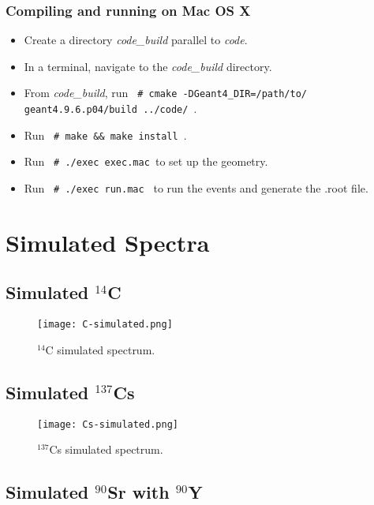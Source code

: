 \documentclass[a4paper,10pt]{article}
\begin{document}
\subsubsection{Compiling and running on Mac OS X}

\begin{itemize}
	\item Create a directory \textit{code\_build} parallel to \textit{code}.
	\item In a terminal, navigate to the \textit{code\_build} directory. 
	\item From \textit{code\_build}, run \texttt{ \# cmake -DGeant4\_DIR=/path/to/\\geant4.9.6.p04/build ../code/ }.
	\item Run \texttt{ \# make \&\& make install }.
	\item Run \texttt{ \# ./exec exec.mac }to set up the geometry.
	\item Run \texttt{ \# ./exec run.mac } to run the events and generate the .root file.
\end{itemize}

\section{Simulated Spectra}

\subsection{Simulated $^{14}$C}

\begin{figure}[!htbp]
	\centering
	\texttt{[image: C-simulated.png]}
	\caption{$^{14}$C simulated spectrum.}
	\label{fig:14Csim}
\end{figure}

\subsection{Simulated $^{137}$Cs}

\begin{figure}[!htbp]
	\centering
	\texttt{[image: Cs-simulated.png]}
	\caption{$^{137}$Cs simulated spectrum.}
	\label{fig:Amsim}
\end{figure}

\subsection{Simulated $^{90}$Sr with $^{90}$Y}
\end{document}
